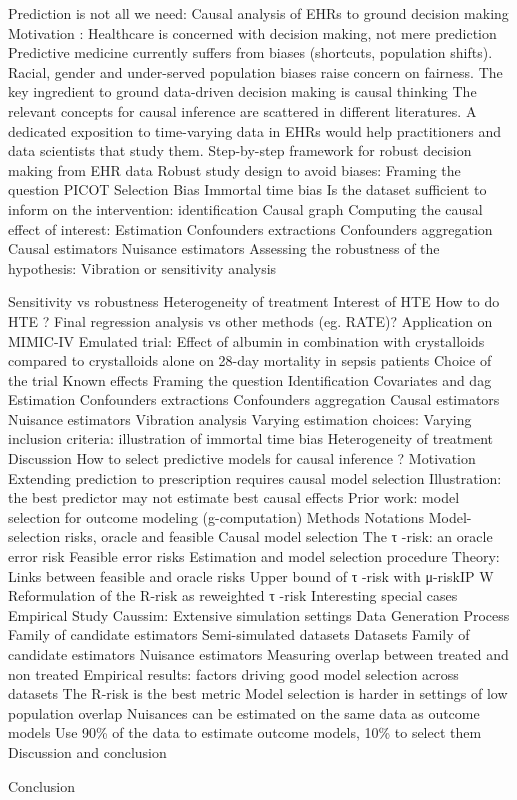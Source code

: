 Prediction is not all we need: Causal analysis of EHRs to ground decision making
Motivation : Healthcare is concerned with decision making, not mere prediction
Predictive medicine currently suffers from biases (shortcuts, population shifts). Racial, gender and under-served population biases raise concern on fairness.
The key ingredient to ground data-driven decision making is causal thinking
The relevant concepts for causal inference are scattered in different literatures. A dedicated exposition to time-varying data in EHRs would help practitioners and data scientists that study them.
Step-by-step framework for robust decision making from EHR data
Robust study design to avoid biases: Framing the question
PICOT
Selection Bias
Immortal time bias
Is the dataset sufficient to inform on the intervention: identification
Causal graph
Computing the causal effect of interest: Estimation
Confounders extractions
Confounders aggregation
Causal estimators
Nuisance estimators
Assessing the robustness of the hypothesis: Vibration or sensitivity analysis

Sensitivity vs robustness
Heterogeneity of treatment
Interest of HTE
How to do HTE ? Final regression analysis vs other methods (eg. RATE)?
Application on MIMIC-IV
Emulated trial: Effect of albumin in combination with crystalloids compared to crystalloids alone on 28-day mortality in sepsis patients
Choice of the trial
Known effects
Framing the question
Identification
Covariates and dag
Estimation
Confounders extractions
Confounders aggregation
Causal estimators
Nuisance estimators
Vibration analysis
Varying estimation choices:
Varying inclusion criteria: illustration of immortal time bias
Heterogeneity of treatment
Discussion
How to select predictive models for causal inference ?
Motivation
Extending prediction to prescription requires causal model selection
Illustration: the best predictor may not estimate best causal effects
Prior work: model selection for outcome modeling (g-computation)
Methods
Notations
Model-selection risks, oracle and feasible
Causal model selection
The τ -risk: an oracle error risk
Feasible error risks
Estimation and model selection procedure
Theory: Links between feasible and oracle risks
Upper bound of τ -risk with μ-riskIP W
Reformulation of the R-risk as reweighted τ -risk
Interesting special cases
Empirical Study
Caussim: Extensive simulation settings
Data Generation Process
Family of candidate estimators
Semi-simulated datasets
Datasets
Family of candidate estimators
Nuisance estimators
Measuring overlap between treated and non treated
Empirical results: factors driving good model selection across datasets
The R-risk is the best metric
Model selection is harder in settings of low population overlap
Nuisances can be estimated on the same data as outcome models
Use 90\% of the data to estimate outcome models, 10\% to select them
Discussion and conclusion




Conclusion


